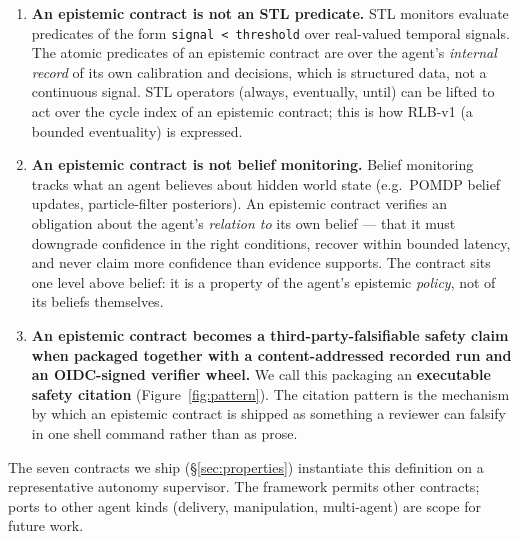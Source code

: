 \documentclass[11pt,a4paper]{article}
\begin{document}
\begin{enumerate}[noitemsep,topsep=2pt]
  \item \textbf{An epistemic contract is not an STL predicate.}
        STL monitors evaluate predicates of the form
        \texttt{signal < threshold} over real-valued temporal
        signals. The atomic predicates of an epistemic contract
        are over the agent's \emph{internal record} of its own
        calibration and decisions, which is structured data, not
        a continuous signal. STL operators (always, eventually,
        until) can be lifted to act over the cycle index of an
        epistemic contract; this is how RLB-v1 (a bounded
        eventuality) is expressed.
  \item \textbf{An epistemic contract is not belief monitoring.}
        Belief monitoring tracks what an agent believes about
        hidden world state (e.g.\ POMDP belief updates,
        particle-filter posteriors). An epistemic contract
        verifies an obligation about the agent's \emph{relation
        to} its own belief --- that it must downgrade confidence
        in the right conditions, recover within bounded latency,
        and never claim more confidence than evidence supports.
        The contract sits one level above belief: it is a
        property of the agent's epistemic \emph{policy}, not of
        its beliefs themselves.
  \item \textbf{An epistemic contract becomes a
        third-party-falsifiable safety claim when packaged
        together with a content-addressed recorded run and an
        OIDC-signed verifier wheel.} We call this packaging an
        \textbf{executable safety citation}
        (Figure~\ref{fig:pattern}). The citation pattern is the
        mechanism by which an epistemic contract is shipped as
        something a reviewer can falsify in one shell command
        rather than as prose.
\end{enumerate}

The seven contracts we ship (\S\ref{sec:properties}) instantiate
this definition on a representative autonomy supervisor. The
framework permits other contracts; ports to other agent kinds
(delivery, manipulation, multi-agent) are scope for future work.
\end{document}
